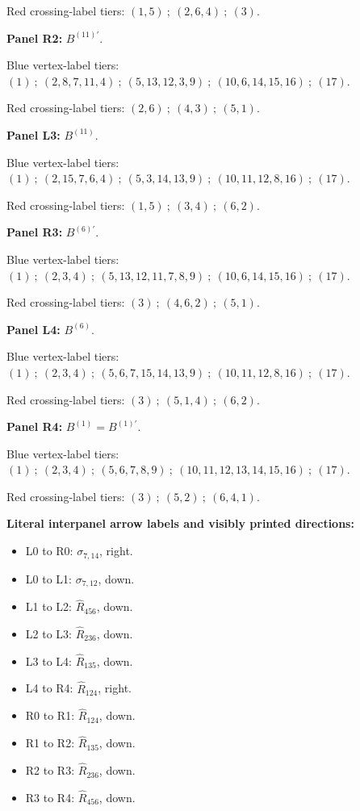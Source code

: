 \documentclass[11pt]{article}
\numberwithin{equation}{section}
\numberwithin{equation}{section}
\begin{document}
\noindent Red crossing-label tiers: $(1,5)\ ;\ (2,6,4)\ ;\ (3)$.\par
\medskip\noindent\textbf{Panel R2:} $B^{(11)\prime}$.\par
\noindent Blue vertex-label tiers: $(1)\ ;\ (2,8,7,11,4)\ ;\ (5,13,12,3,9)\ ;\ (10,6,14,15,16)\ ;\ (17)$.\par
\noindent Red crossing-label tiers: $(2,6)\ ;\ (4,3)\ ;\ (5,1)$.\par
\medskip\noindent\textbf{Panel L3:} $B^{(11)}$.\par
\noindent Blue vertex-label tiers: $(1)\ ;\ (2,15,7,6,4)\ ;\ (5,3,14,13,9)\ ;\ (10,11,12,8,16)\ ;\ (17)$.\par
\noindent Red crossing-label tiers: $(1,5)\ ;\ (3,4)\ ;\ (6,2)$.\par
\medskip\noindent\textbf{Panel R3:} $B^{(6)\prime}$.\par
\noindent Blue vertex-label tiers: $(1)\ ;\ (2,3,4)\ ;\ (5,13,12,11,7,8,9)\ ;\ (10,6,14,15,16)\ ;\ (17)$.\par
\noindent Red crossing-label tiers: $(3)\ ;\ (4,6,2)\ ;\ (5,1)$.\par
\medskip\noindent\textbf{Panel L4:} $B^{(6)}$.\par
\noindent Blue vertex-label tiers: $(1)\ ;\ (2,3,4)\ ;\ (5,6,7,15,14,13,9)\ ;\ (10,11,12,8,16)\ ;\ (17)$.\par
\noindent Red crossing-label tiers: $(3)\ ;\ (5,1,4)\ ;\ (6,2)$.\par
\medskip\noindent\textbf{Panel R4:} $B^{(1)}=B^{(1)\prime}$.\par
\noindent Blue vertex-label tiers: $(1)\ ;\ (2,3,4)\ ;\ (5,6,7,8,9)\ ;\ (10,11,12,13,14,15,16)\ ;\ (17)$.\par
\noindent Red crossing-label tiers: $(3)\ ;\ (5,2)\ ;\ (6,4,1)$.\par
\medskip\noindent\textbf{Literal interpanel arrow labels and visibly printed directions:}\par
\begin{itemize}\itemsep=0pt
\item L0 to R0: $\sigma_{7,14}$, right.
\item L0 to L1: $\sigma_{7,12}$, down.
\item L1 to L2: $\widehat{R}_{456}$, down.
\item L2 to L3: $\widehat{R}_{236}$, down.
\item L3 to L4: $\widehat{R}_{135}$, down.
\item L4 to R4: $\widehat{R}_{124}$, right.
\item R0 to R1: $\widehat{R}_{124}$, down.
\item R1 to R2: $\widehat{R}_{135}$, down.
\item R2 to R3: $\widehat{R}_{236}$, down.
\item R3 to R4: $\widehat{R}_{456}$, down.
\end{itemize}
\end{document}
